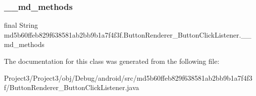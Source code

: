 \subsubsection{\texorpdfstring{\+\_\+\+\_\+md\+\_\+methods}{\_\_md\_methods}}
{\footnotesize\ttfamily final String md5b60ffeb829f638581ab2bb9b1a7f4f3f.\+Button\+Renderer\+\_\+\+Button\+Click\+Listener.\+\_\+\+\_\+md\+\_\+methods\hspace{0.3cm}{\ttfamily [static]}}



The documentation for this class was generated from the following file\+:\begin{DoxyCompactItemize}
\item 
Project3/\+Project3/obj/\+Debug/android/src/md5b60ffeb829f638581ab2bb9b1a7f4f3f/Button\+Renderer\+\_\+\+Button\+Click\+Listener.\+java\end{DoxyCompactItemize}
